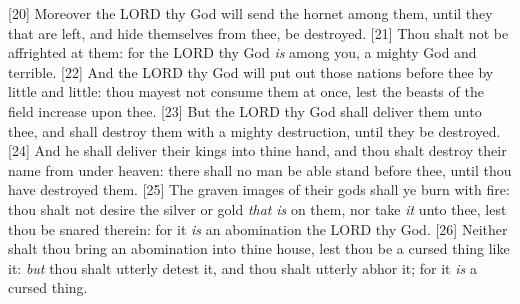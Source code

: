 [20] \textcolor[cmyk]{0.99998,1,0,0}{Moreover the LORD thy God will send the hornet among them, until they that are left, and hide themselves from thee, be destroyed.}
[21] \textcolor[cmyk]{0.99998,1,0,0}{Thou shalt not be affrighted at them: for the LORD thy God \emph{is} among you, a mighty God and terrible.}
[22] \textcolor[cmyk]{0.99998,1,0,0}{And the LORD thy God will put out those nations before thee by little and little: thou mayest not consume them at once, lest the beasts of the field increase upon thee.}
[23] \textcolor[cmyk]{0.99998,1,0,0}{But the LORD thy God shall deliver them unto thee, and shall destroy them with a mighty destruction, until they be destroyed.}
[24] \textcolor[cmyk]{0.99998,1,0,0}{And he shall deliver their kings into thine hand, and thou shalt destroy their name from under heaven: there shall no man be able stand before thee, until thou have destroyed them.}
[25] \textcolor[cmyk]{0.99998,1,0,0}{The graven images of their gods shall ye burn with fire: thou shalt not desire the silver or gold \emph{that} \emph{is} on them, nor take \emph{it} unto thee, lest thou be snared therein: for it \emph{is} an abomination the LORD thy God.}
[26] \textcolor[cmyk]{0.99998,1,0,0}{Neither shalt thou bring an abomination into thine house, lest thou be a cursed thing like it: \emph{but} thou shalt utterly detest it, and thou shalt utterly abhor it; for it \emph{is} a cursed thing.}